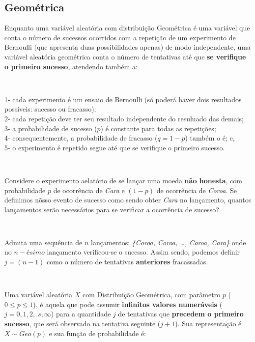 \documentclass[
]{book}
\begin{document}
\hypertarget{geomuxe9trica-1}{%
\subsection{Geométrica}\label{geomuxe9trica-1}}

Enquanto uma variável aleatória com distribuição Geométrica é uma variável que conta o número de sucessos ocorridos com a repetição de um experimento de Bernoulli (que apresenta duas possibilidades apenas) de modo independente, uma variável aleatória geométrica conta o número de tentativas até que \textbf{se verifique o primeiro sucesso}, atendendo também a:

~

1- cada experimento é um ensaio de Bernoulli (só poderá haver dois resultados possíveis: sucesso ou fracasso);\\
2- cada repetição deve ter seu resultado independente do resuluado das demais;\\
3- a probabilidade de sucesso (\(p\)) é constante para todas as repetições;\\
4- consequentemente, a probabilidade de fracasso (\(q=1-p\)) também o é; e,\\
5- o experimento é repetido segue até que se verifique o primeiro sucesso.

~

Considere o experimento aelatório de se lançar uma moeda \textbf{não honesta}, com probabilidade \(p\) de ocorrência de \emph{Cara} e \((1-p)\) de ocorrência de \emph{Coroa}. Se definimos nõsso evento de sucesso como sendo obter \emph{Cara} no lançamento, quantos lançamentos serão necessários para se verificar a ocorrência de sucesso?

~

Admita uma sequência de \(n\) lançamentos: \emph{\{Coroa, Coroa, \ldots, Coroa, Cara\}} onde no \(n-ésimo\) lançamento verificou-se o sucesso. Assim sendo, podemos definir \(j=(n-1)\) como o número de tentativas \textbf{anteriores} fracassadas.

~

Uma variável aleatória \(X\) com Distribuição Geométrica, com parâmetro \(p\) (\(0 \le p \le1\)), é aquela que pode assumir \textbf{infinitos valores numeráveis} (\(j=0,1,2, .s, \infty\)) para a quantidade \(j\) de tentativas que \textbf{precedem o primeiro sucesso}, que será observado na tentativa seguinte (\(j+1\)). Sua representação é \(X\sim Geo(p)\) e sua função de probabilidade é:

\hfill\break
\end{document}
